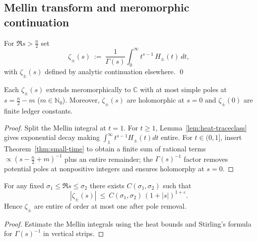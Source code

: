 
\subsection{Mellin transform and meromorphic continuation}
\label{subsec:ch6-part2-mellin} \relax \hspace{0pt}
\begin{definition}
\label{def:sector-zeta}
For $\Re s>\tfrac{n}{2}$ set
\[
\zeta_\pm(s)\ :=\ \frac{1}{\Gamma(s)}\int_0^\infty t^{s-1}\,H_\pm(t)\,dt,
\]
with $\zeta_\pm(s)$ defined by analytic continuation elsewhere. \qed
\end{definition}

\begin{theorem}[Meromorphic continuation and finite value at $s=0$]
\label{thm:zeta-meromorphic}
Each $\zeta_\pm(s)$ extends meromorphically to $\mathbb C$ with at most simple poles at $s=\tfrac{n}{2}-m$ ($m\in\mathbb N_0$). Moreover, $\zeta_\pm(s)$ are holomorphic at $s=0$ and $\zeta_\pm(0)$ are finite ledger constants.
\end{theorem}

\begin{proof}
Split the Mellin integral at $t=1$. For $t\ge1$, Lemma~\ref{lem:heat-traceclass} gives exponential decay making $\int_1^\infty t^{s-1}H_\pm(t)dt$ entire. For $t\in(0,1]$, insert Theorem~\ref{thm:small-time} to obtain a finite sum of rational terms $\propto (s-\tfrac{n}{2}+m)^{-1}$ plus an entire remainder; the $\Gamma(s)^{-1}$ factor removes potential poles at nonpositive integers and ensures holomorphy at $s=0$. %
\end{proof}

\begin{lemma}
\label{lem:zeta-growth}
For any fixed $\sigma_1\le \Re s\le \sigma_2$ there exists $C(\sigma_1,\sigma_2)$ such that
\[
|\zeta_\pm(s)|\ \le\ C(\sigma_1,\sigma_2)\,(1+|s|)^{1+\varepsilon}.
\]
Hence $\zeta_\pm$ are entire of order at most one after pole removal.
\end{lemma}

\begin{proof}
Estimate the Mellin integrals using the heat bounds and Stirling’s formula for $\Gamma(s)^{-1}$ in vertical strips. %
\end{proof}


